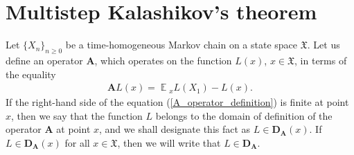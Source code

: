 \documentclass[10pt, reqno]{amsart}
\theoremstyle{definition}
\newcommand{\atoVar}{\mathbf{A}} %
\newcommand{\ltfVar}{L} %
\newcommand{\assVar}{\mathfrak{X}} %
\newcommand{\akdVar}{\mathbf{D}_{\atoVar}} %
\DeclareMathOperator*{\E}{\mathbb{E}}
\begin{document}
	
	\section{Multistep Kalashikov's theorem}
	Let $\{X_{n}\}_{n \geq 0}$ be a time-homogeneous Markov chain on a state space $\assVar$. Let us define an operator $\atoVar$, which operates on the function $\ltfVar(x)$, $x \in \assVar$, in terms of the equality
	\begin{gather}
	\atoVar\ltfVar(x) = \E{}_{x}\ltfVar(X_{1}) - \ltfVar(x).
	\label{A_operator_definition}
	\end{gather}
	If the right-hand side of the equation (\ref{A_operator_definition}) is finite at point $x$, then we say that the function $\ltfVar$ belongs to the domain of definition of the operator $\atoVar$ at point $x$, and we shall designate this fact as $\ltfVar \in \akdVar(x)$. If $\ltfVar \in \akdVar(x)$ for all $x \in \assVar$, then we will write that $\ltfVar \in \akdVar$.
	
\end{document}
